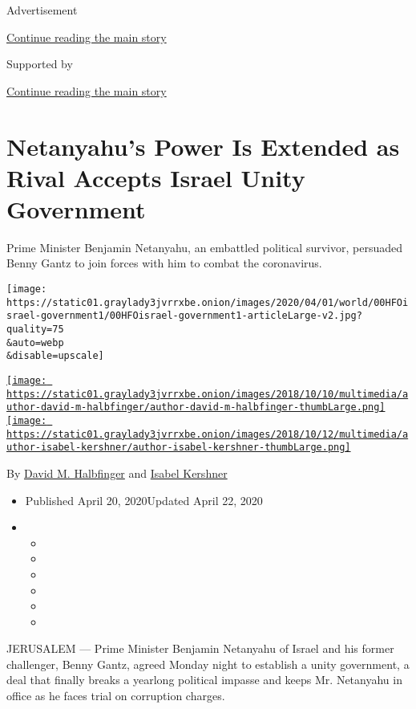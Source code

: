 Advertisement

\protect\hyperlink{after-top}{Continue reading the main story}

Supported by

\protect\hyperlink{after-sponsor}{Continue reading the main story}

\hypertarget{netanyahus-power-is-extended-as-rival-accepts-israel-unity-government}{%
\section{Netanyahu's Power Is Extended as Rival Accepts Israel Unity
Government}\label{netanyahus-power-is-extended-as-rival-accepts-israel-unity-government}}

Prime Minister Benjamin Netanyahu, an embattled political survivor,
persuaded Benny Gantz to join forces with him to combat the coronavirus.

\texttt{[image: https://static01.graylady3jvrrxbe.onion/images/2020/04/01/world/00HFOisrael-government1/00HFOisrael-government1-articleLarge-v2.jpg?quality=75\\\&auto=webp\\\&disable=upscale]}

\href{https://www.nytimes3xbfgragh.onion/by/david-m-halbfinger}{\texttt{[image: https://static01.graylady3jvrrxbe.onion/images/2018/10/10/multimedia/author-david-m-halbfinger/author-david-m-halbfinger-thumbLarge.png]}}\href{https://www.nytimes3xbfgragh.onion/by/isabel-kershner}{\texttt{[image: https://static01.graylady3jvrrxbe.onion/images/2018/10/12/multimedia/author-isabel-kershner/author-isabel-kershner-thumbLarge.png]}}

By \href{https://www.nytimes3xbfgragh.onion/by/david-m-halbfinger}{David
M. Halbfinger} and
\href{https://www.nytimes3xbfgragh.onion/by/isabel-kershner}{Isabel
Kershner}

\begin{itemize}
\item
  Published April 20, 2020Updated April 22, 2020
\item
  \begin{itemize}
  \item
  \item
  \item
  \item
  \item
  \item
  \end{itemize}
\end{itemize}

JERUSALEM --- Prime Minister Benjamin Netanyahu of Israel and his former
challenger, Benny Gantz, agreed Monday night to establish a unity
government, a deal that finally breaks a yearlong political impasse and
keeps Mr. Netanyahu in office as he faces trial on corruption charges.

